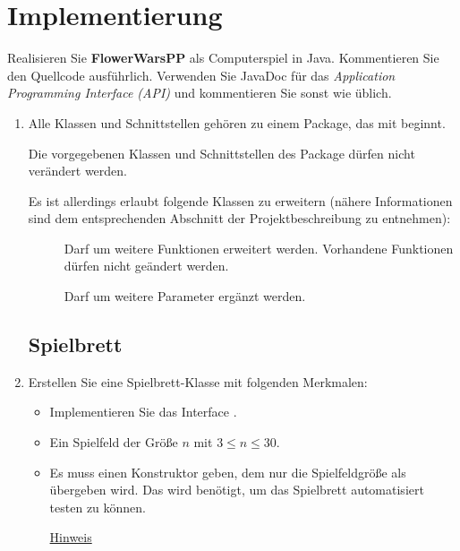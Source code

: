 \section*{Implementierung}
Realisieren Sie \textbf{FlowerWarsPP} als Computerspiel in Java. Kommentieren Sie den Quellcode ausführlich. Verwenden Sie JavaDoc für das \emph{Application Programming Interface (API)} und kommentieren Sie sonst wie üblich.

\begin{enumerate}
\item Alle Klassen und Schnittstellen gehören zu einem Package, das mit  beginnt.

Die vorgegebenen Klassen und Schnittstellen des Package  dürfen nicht verändert werden. 

Es ist allerdings erlaubt folgende Klassen zu erweitern (nähere Informationen sind dem entsprechenden Abschnitt der Projektbeschreibung zu entnehmen):
\begin{description}
\item[] Darf um weitere Funktionen erweitert werden. Vorhandene Funktionen dürfen nicht geändert werden.
\item[] Darf um weitere Parameter ergänzt werden.
\end{description}

\subsection*{Spielbrett}

\item Erstellen Sie eine Spielbrett-Klasse mit folgenden Merkmalen:
\begin{itemize}
\item Implementieren Sie das Interface .
\item Ein Spielfeld der Größe $n$ mit $3 \le n \le 30$.
\item Es muss einen Konstruktor geben, dem nur die Spielfeldgröße als  übergeben wird. Das wird benötigt, um das Spielbrett automatisiert testen zu können.

\underline{Hinweis}


\end{itemize}
\end{enumerate}
